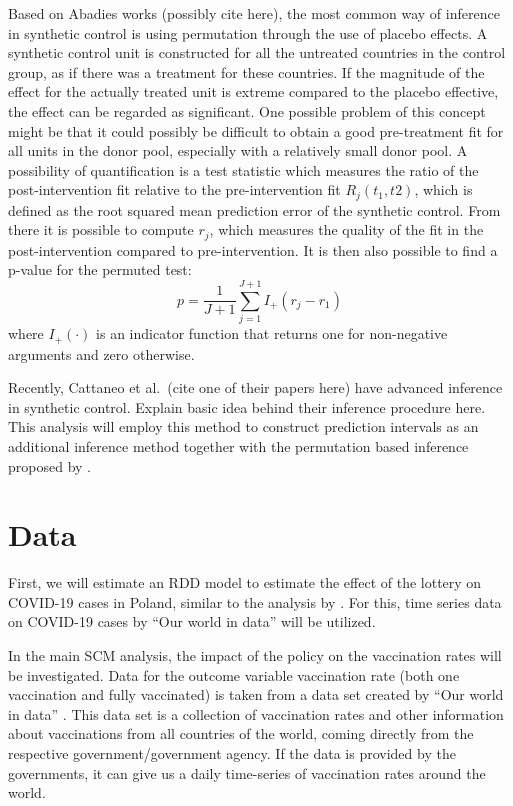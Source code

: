 \documentclass{scrbook}
\begin{document}
Based on Abadies works (possibly cite here), the most common way of
inference in synthetic control is using permutation through the use of
placebo effects. A synthetic control unit is constructed for all the
untreated countries in the control group, as if there was a treatment
for these countries. If the magnitude of the effect for the actually
treated unit is extreme compared to the placebo effective, the effect
can be regarded as significant. One possible problem of this concept
might be that it could possibly be difficult to obtain a good
pre-treatment fit for all units in the donor pool, especially with a
relatively small donor pool. A possibility of quantification is a test
statistic which measures the ratio of the post-intervention fit relative
to the pre-intervention fit \(R_{j}(t_{1},t{2})\), which is defined as
the root squared mean prediction error of the synthetic control. From
there it is possible to compute \(r_{j}\), which measures the quality of
the fit in the post-intervention compared to pre-intervention. It is
then also possible to find a p-value for the permuted test:
\begin{equation}
p=\frac{1}{J+1}\sum_{j=1}^{J+1}I_{+}(r_{j}-r_{1})
\end{equation} where \(I_{+}(\cdot)\) is an indicator function that
returns one for non-negative arguments and zero otherwise.

Recently, Cattaneo et al.~(cite one of their papers here) have advanced
inference in synthetic control. Explain basic idea behind their
inference procedure here. This analysis will employ this method to
construct prediction intervals as an additional inference method
together with the permutation based inference proposed by
\textcite{abadie_synthetic_2010}.

\section{Data}

First, we will estimate an RDD model to estimate the effect of the
lottery on COVID-19 cases in Poland, similar to the analysis by
\textcite{kuznetsova_effectiveness_2022}. For this, time series data on
COVID-19 cases by ``Our world in data'' will be utilized.

In the main SCM analysis, the impact of the policy on the vaccination
rates will be investigated. Data for the outcome variable vaccination
rate (both one vaccination and fully vaccinated) is taken from a data
set created by ``Our world in data'' \parencite{mathieu_global_2021}.
This data set is a collection of vaccination rates and other information
about vaccinations from all countries of the world, coming directly from
the respective government/government agency. If the data is provided by
the governments, it can give us a daily time-series of vaccination rates
around the world.
\end{document}
